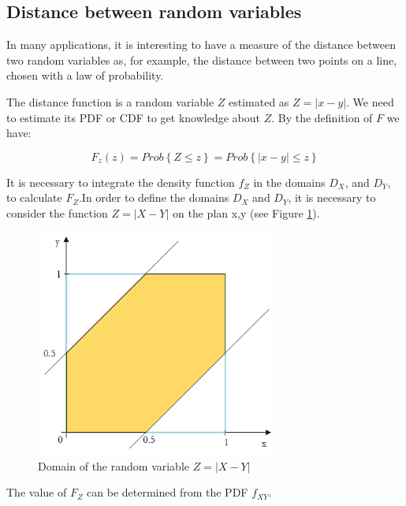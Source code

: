 \subsection{Distance between random variables}
In many applications, it is interesting to have a measure of the distance between two random variables as, for example, the distance between two points on a line, chosen with a law of probability. \par

The distance function is a random variable $Z$ estimated as $Z=|x-y|$. We need to estimate its PDF or CDF to get knowledge about $Z$. By the definition of $F$ we have:

\begin{equation}
F_z\left(z\right)=Prob{\left\{Z\le z\right\}}=Prob\left\{\left|x-y\right|\le z\right\}
\label{eq_Distance1}
\end{equation}

It is necessary to integrate the density function $f_Z$ in the domains $D_X$, and $D_Y$, to calculate $F_Z$.In order to define the domains $D_X$ and $D_Y$, it is necessary to consider the function $Z=\left|X-Y\right|$ on the plan x,y (see Figure \ref{fig_DistanceDomain}).

\begin{figure}[hbt!]
\centering
\includegraphics[width=0.7\textwidth]{SectionLetsMath/elemStat_figures/fig_DistanceDomain.png}
\captionsetup{type=figure}
\caption{Domain of the random variable $Z=|X-Y|$}
\label{fig_DistanceDomain}
\end{figure}

The value of $F_Z$ can be determined from the PDF $f_{XY}$.

